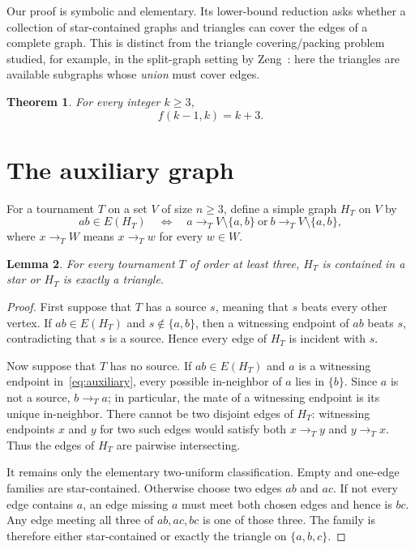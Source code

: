 \documentclass[11pt]{article}
\newtheorem{theorem}{Theorem}
\newtheorem{lemma}[theorem]{Lemma}
\begin{document}
Our proof is symbolic and elementary.  Its lower-bound reduction asks
whether a collection of star-contained graphs and triangles can cover the
edges of a complete graph.  This is distinct from the triangle
covering/packing problem studied, for example, in the split-graph setting
by Zeng~\cite{Zeng2026Tuza}: here the triangles are available subgraphs
whose \emph{union} must cover edges.

\begin{theorem}\label{thm:main}
For every integer $k\geq3$,
\[
    f(k-1,k)=k+3.
\]
\end{theorem}

\section{The auxiliary graph}

For a tournament $T$ on a set $V$ of size $n\geq3$, define a simple graph
$H_T$ on $V$ by
\begin{equation}\label{eq:auxiliary}
 ab\in E(H_T)
 \quad\Longleftrightarrow\quad
 a\to_T V\setminus\{a,b\}
 \ \text{or}\ 
 b\to_T V\setminus\{a,b\},
\end{equation}
where $x\to_T W$ means $x\to_T w$ for every $w\in W$.

\begin{lemma}\label{lem:structure}
For every tournament $T$ of order at least three, $H_T$ is contained in a
star or $H_T$ is exactly a triangle.
\end{lemma}

\begin{proof}
First suppose that $T$ has a source $s$, meaning that $s$ beats every
other vertex.  If $ab\in E(H_T)$ and $s\notin\{a,b\}$, then a witnessing
endpoint of $ab$ beats $s$, contradicting that $s$ is a source.  Hence
every edge of $H_T$ is incident with $s$.

Now suppose that $T$ has no source.  If $ab\in E(H_T)$ and $a$ is a
witnessing endpoint in~\eqref{eq:auxiliary}, every possible in-neighbor of
$a$ lies in $\{b\}$.  Since $a$ is not a source, $b\to_T a$; in
particular, the mate of a witnessing endpoint is its unique in-neighbor.
There cannot be two disjoint edges of $H_T$: witnessing endpoints $x$ and
$y$ for two such edges would satisfy both $x\to_T y$ and $y\to_T x$.
Thus the edges of $H_T$ are pairwise intersecting.

It remains only the elementary two-uniform classification.  Empty and
one-edge families are star-contained.  Otherwise choose two edges $ab$
and $ac$.  If not every edge contains $a$, an edge missing $a$ must meet
both chosen edges and hence is $bc$.  Any edge meeting all three of
$ab,ac,bc$ is one of those three.  The family is therefore either
star-contained or exactly the triangle on $\{a,b,c\}$.
\end{proof}
\end{document}
